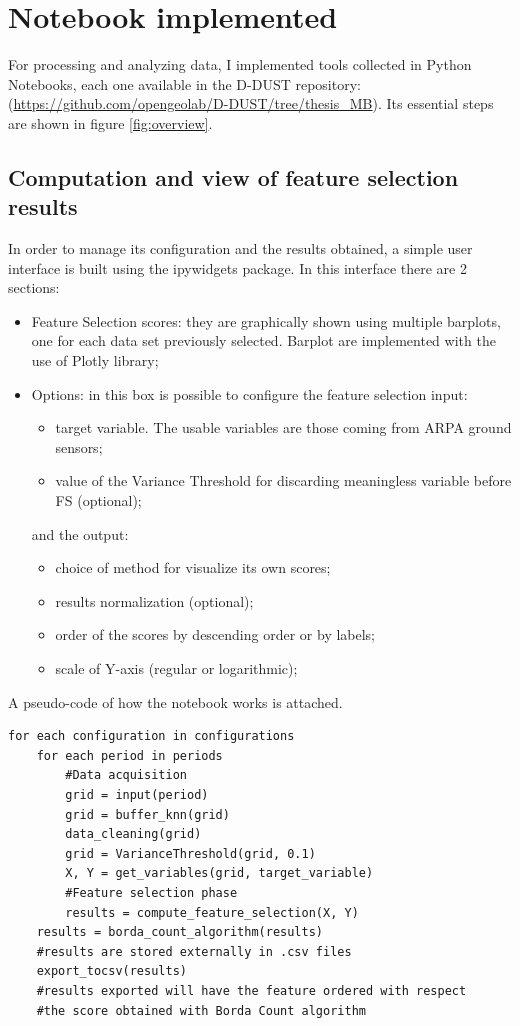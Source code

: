 \section{Notebook implemented}
For processing and analyzing data, I implemented tools collected in Python Notebooks, each one available in the D-DUST repository:
(\url{https://github.com/opengeolab/D-DUST/tree/thesis_MB}).\newline
Its essential steps are shown in figure \ref{fig:overview}.

\subsection{Computation and view of feature selection results}
In order to manage its configuration and the results obtained, a simple user interface is built using the ipywidgets package.
In this interface there are 2 sections:
\begin{itemize}
\item Feature Selection scores: they are graphically shown using multiple barplots, one for each data set previously selected. Barplot are implemented with the use of Plotly library; 
\item Options: in this box is possible to configure the feature selection input:
\begin{itemize}
\item target variable. The usable variables are those coming from ARPA ground sensors;
\item value of the Variance Threshold for discarding meaningless variable before FS (optional);
\end{itemize}
and the output:
\begin{itemize}
\item choice of method for visualize its own scores;
\item results normalization (optional);
\item order of the scores by descending order or by labels;
\item scale of Y-axis (regular or logarithmic);
\end{itemize}
\end{itemize}
A pseudo-code of how the notebook works is attached.
\begin{verbatim}
for each configuration in configurations
    for each period in periods
        #Data acquisition
        grid = input(period)
        grid = buffer_knn(grid)
        data_cleaning(grid)
        grid = VarianceThreshold(grid, 0.1)
        X, Y = get_variables(grid, target_variable)
        #Feature selection phase
        results = compute_feature_selection(X, Y)
    results = borda_count_algorithm(results)
    #results are stored externally in .csv files
    export_tocsv(results) 
    #results exported will have the feature ordered with respect
    #the score obtained with Borda Count algorithm
\end{verbatim}
